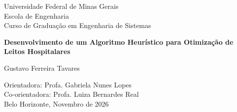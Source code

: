\begin{titlepage}
\begin{center}
{\large Universidade Federal de Minas Gerais\\
Escola de Engenharia \\
Curso de Graduação em Engenharia de Sistemas\\}

\vspace{6cm}
{\bf\Large Desenvolvimento de um Algoritmo Heurístico para Otimização de Leitos Hospitalares}%

\vspace{4cm}

{\large Gustavo Ferreira Tavares}
\vspace{2cm}  
   
\vspace{2cm}          
{\large Orientadora: Profa. Gabriela Nunes Lopes} \\

{\large Co-orientadora:  Profa. Luiza Bernardes Real}\\


\vfill
{\large Belo Horizonte, Novembro de 2026 }
\end{center}

\end{titlepage}

\newpage
\clearpage
\thispagestyle{empty}

